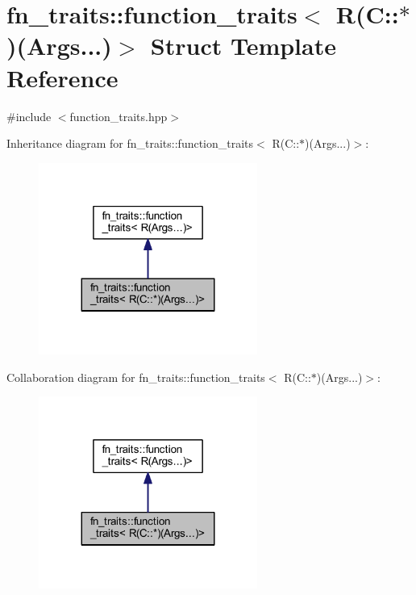 \hypertarget{structfn__traits_1_1function__traits_3_01_r_07_c_1_1_5_08_07_args_8_8_8_08_4}{}\section{fn\+\_\+traits\+:\+:function\+\_\+traits$<$ R(C\+:\+:$\ast$)(Args...)$>$ Struct Template Reference}
\label{structfn__traits_1_1function__traits_3_01_r_07_c_1_1_5_08_07_args_8_8_8_08_4}


{\ttfamily \#include $<$function\+\_\+traits.\+hpp$>$}



Inheritance diagram for fn\+\_\+traits\+:\+:function\+\_\+traits$<$ R(C\+:\+:$\ast$)(Args...)$>$\+:\nopagebreak
\begin{figure}[H]
\begin{center}
\leavevmode
\includegraphics[width=203pt]{d8/df2/structfn__traits_1_1function__traits_3_01_r_07_c_1_1_5_08_07_args_8_8_8_08_4__inherit__graph}
\end{center}
\end{figure}


Collaboration diagram for fn\+\_\+traits\+:\+:function\+\_\+traits$<$ R(C\+:\+:$\ast$)(Args...)$>$\+:\nopagebreak
\begin{figure}[H]
\begin{center}
\leavevmode
\includegraphics[width=203pt]{d3/d96/structfn__traits_1_1function__traits_3_01_r_07_c_1_1_5_08_07_args_8_8_8_08_4__coll__graph}
\end{center}
\end{figure}
